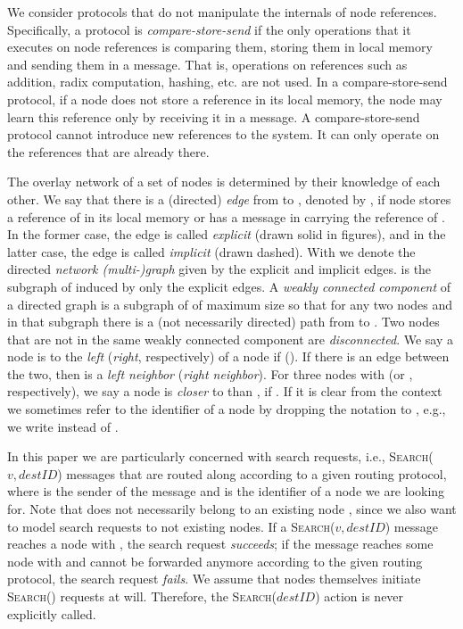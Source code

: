 \documentclass[a4paper,USenglish]{lipics}
\newcommand{\search}[1]{\textsc{Search(\ensuremath{#1})}\xspace}
\begin{document}
We consider protocols that do not manipulate the internals of node
references. Specifically, a protocol is \emph{compare-store-send} if the only
operations that it executes on node references is comparing them, storing
them in local memory and sending them in a message. That is, operations on
references such as addition, radix computation, hashing, etc. are not used. In
a compare-store-send protocol, if a node does not store a reference in its
local memory, the node may learn this reference only by receiving it in a
message. A compare-store-send protocol cannot introduce new references to the
system. It can only operate on the references that are already there.

The overlay network of a set of nodes is determined by their knowledge of each other. 
We say that there is a (directed) \emph{edge} from  to , denoted by , if node  stores a reference of  in its local memory or has a message in  carrying the reference of . 
In the former case, the edge is called \emph{explicit} (drawn solid in figures), and in the latter case, the edge is called \emph{implicit} (drawn dashed). 
With  we denote the directed \emph{network (multi-)graph} given by the explicit and implicit edges.
 is the subgraph of  induced by only the explicit edges. 
A \emph{weakly connected component} of a directed graph  is a subgraph of  of maximum size so that for any two nodes  and  in that subgraph there is a (not necessarily directed) path from  to . 
Two nodes that are not in the same weakly connected component are \emph{disconnected}.
We say a node  is to the \emph{left} (\emph{right}, respectively) of a node  if  ().
If there is an edge  between the two, then  is a \emph{left neighbor} (\emph{right neighbor}).
For three nodes  with  (or , respectively), we say a node  is \emph{closer} to  than , if .
If it is clear from the context we sometimes refer to the identifier of a node by dropping the  notation to , e.g., we write  instead of .

In this paper we are particularly concerned with search requests, i.e., \search{v,destID} messages that are routed along  according to a given routing protocol, where  is the sender of the message and  is the identifier of a node we are looking for.
Note that  does not necessarily belong to an existing node , since we also want to model search requests to not existing nodes. 
If a \search{v,destID} message reaches a node  with , the search request \emph{succeeds}; if the message reaches some node  with  and cannot be forwarded anymore according to the given routing protocol, the search request \emph{fails}.
We assume that nodes themselves initiate \search{} requests at will.
Therefore, the \search{destID} action is never explicitly called.
\end{document}
